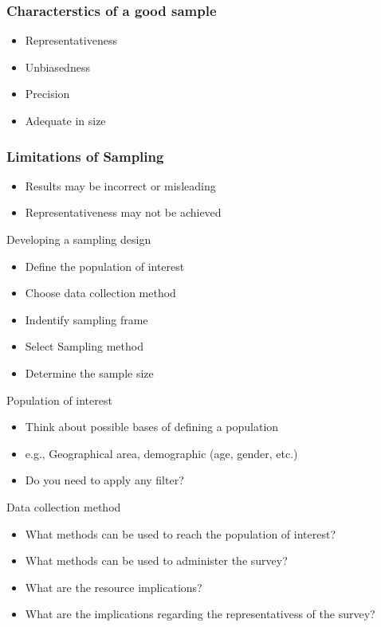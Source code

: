 \documentclass[10pt, compress]{beamer}
\begin{document}
\begin{frame}
    \frametitle{Characterstics of a good sample}
    \begin{itemize}
        \item Representativeness
        \item Unbiasedness
        \item Precision
        \item Adequate in size
    \end{itemize}
\end{frame}

\begin{frame}
    \frametitle{Limitations of Sampling}
    \begin{itemize}
        \item Results may be incorrect or misleading
        \item Representativeness may not be achieved
    \end{itemize}
\end{frame}

\begin{frame}[t]{Developing a sampling design}
    \begin{itemize}
        \item Define the population of interest
        \item Choose data collection method
        \item Indentify sampling frame
        \item Select Sampling method
        \item Determine the sample size
    \end{itemize}
\end{frame}

\begin{frame}[t]{Population of interest}
    \begin{itemize}
        \item Think about possible bases of defining a population
        \item e.g., Geographical area, demographic (age, gender, etc.)
        \item Do you need to apply any filter?
    \end{itemize}
\end{frame}

\begin{frame}[t]{Data collection method}
    \begin{itemize}
        \item What methods can be used to reach the population of interest?
        \item What methods can be used to administer the survey?
        \item What are the resource implications?
        \item What are the implications regarding the representativess of the survey?
    \end{itemize}
\end{frame}
\end{document}
